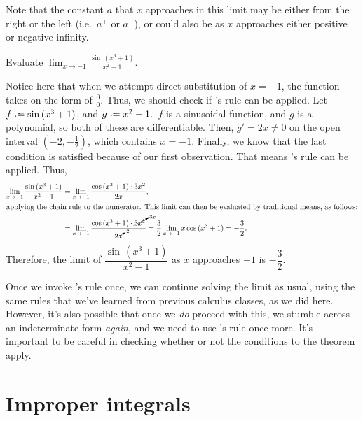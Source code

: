 Note that the constant \(a\) that \(x\) approaches in this limit may be either from the right or the left (i.e.\ \(a^+\) or \(a^-\)), or could also be as \(x\) 
approaches either positive or negative infinity.\par 
\begin{example}
    Evaluate \(\displaystyle{} \lim_{x\to -1} \frac{\sin \,(x^3 + 1)}{x^2 -1 }\).\par 
    Notice here that when we attempt direct substitution of \(x = -1 \), the function takes on the form of \(\frac{0}{0}\). Thus, we should check if \lh's rule can be applied. 
    Let \(f \defeq \sin\, (x^3 + 1)\), and \( g \defeq x^2 - 1\).\ \(f\) is a sinusoidal function, and \(g\) is a polynomial, so both of these are differentiable. Then, \(g' = 2x \neq 0\) on 
    the open interval \((-2, -\frac{1}{2})\), which contains \(x = -1\). Finally, we know that the last condition is satisfied because of our first observation. That means \lh's rule 
    can be applied. Thus,\begin{align*}
        \lim_{x\to -1} \frac{\sin \,(x^3 + 1)}{x^2 -1 } &= \lim_{x \to -1} \frac{\cos \, (x^3 + 1) \cdot 3x^2}{2x},\\ 
        \intertext{applying the chain rule to the numerator. This limit can then be evaluated by traditional means, as follows:}
        &= \lim_{x \to -1} \frac{\cos \, (x^3 + 1) \cdot \cancelto{3x}{3x^2}}{\cancelto{2}{2x}} = \frac{3}{2} \lim_{x\to -1} x \cos\, (x^3 + 1) = -\frac{3}{2}. 
    \end{align*}
    Therefore, the limit of \(\dfrac{\sin \,(x^3 + 1)}{x^2 -1 }\) as \(x\) approaches \(-1\) is \(-\dfrac{3}{2}\). 
\end{example} 
Once we invoke \lh's rule once, we can continue solving the limit as usual, using the same rules that we've learned from previous calculus classes, as we did here. However, it's also 
possible that once we \textit{do} proceed with this, we stumble across an indeterminate form \textit{again}, and we need to use \lh's rule once more. It's important to be 
careful in checking whether or not the conditions to the theorem apply. 
\section{Improper integrals}